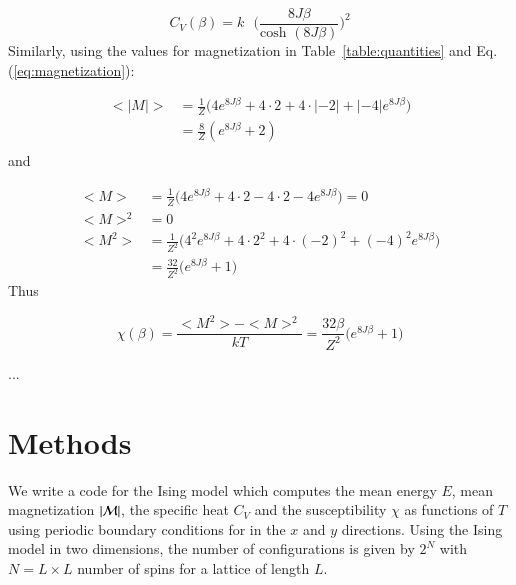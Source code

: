 \documentclass{article}
\begin{document}
\begin{multicols}{2}
\begin{equation}
	C_V(\beta) = k \textrm{ } \bigg( \frac{8J\beta}{\textrm{cosh }(8J\beta)} \bigg)^2
\end{equation}
Similarly, using the values for magnetization in Table~\ref{table:quantities} and Eq. (\ref{eq:magnetization}):

\begin{equation}
\begin{aligned}
	<|M|> 	&= \frac{1}{Z} \bigg( 4e^{8J\beta} + 4\cdot2 + 4\cdot|-2| + |-4|e^{8J\beta} \bigg) \\
			&= \frac{8}{Z}(e^{8J\beta} + 2) \\
\end{aligned}
\end{equation}
and

\begin{equation}
\begin{aligned}
	<M> 		&= \frac{1}{Z} \bigg( 4e^{8J\beta} + 4\cdot2 - 4\cdot2 - 4e^{8J\beta} \bigg) = 0 \\
	<M>^2 	&= 0 \\
	<M^2> 	&= \frac{1}{Z^2} \bigg( 4^2 e^{8J\beta} + 4\cdot2^2 + 4\cdot(-2)^2 + (-4)^2e^{8J\beta}   \bigg) \\
			&= \frac{32}{Z^2} \bigg( e^{8J\beta} + 1  \bigg)
\end{aligned}
\end{equation}
Thus

\begin{equation}
	\chi(\beta) = \frac{<M^2> - <M>^2}{kT} = \frac{32 \beta}{Z^2} \bigg(e^{8J\beta} + 1  \bigg)
\end{equation}




... 










\section{Methods}

We write a code for the Ising model which computes the mean energy $E$, mean magnetization $|{\cal M}|$, the specific heat $C_V$ and the susceptibility $\chi$ as functions of  $T$ using periodic boundary conditions for in the $x$ and $y$ directions. Using the Ising model in two dimensions, the number of configurations is given by $2^N$ with $N = L \times L$ number of spins for a lattice of length $L$. 


\end{multicols}
\end{document}
